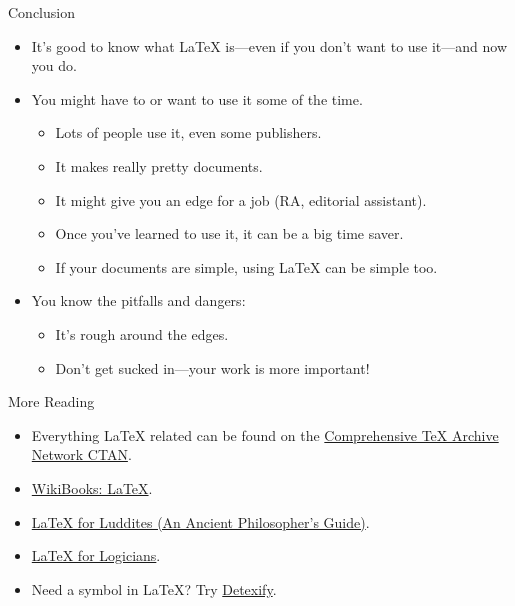 \begin{frame}{Conclusion}

\begin{itemize}
\item It's good to know what \LaTeX{} is---even if you don't want to
  use it---and now you do.
\item You might have to or want to use it some of the time.
\begin{itemize}
\item Lots of people use it, even some publishers.
\item It makes really pretty documents.
\item It might give you an edge for a job (RA, editorial assistant).
\item Once you've learned to use it, it can be a big time saver.
\item If your documents are simple, using \LaTeX{} can be simple too.
\end{itemize}
\item You know the pitfalls and dangers:
\begin{itemize}
\item It's rough around the edges.
\item Don't get sucked in---your work is more important!
\end{itemize}
\end{itemize}
\end{frame}

\begin{frame}{More Reading}

\begin{itemize}
\item Everything \LaTeX{} related can be found on the
  \href{http://www.ctan.org/}{Comprehensive \TeX{} Archive Network
    CTAN}.
\item \href{http://en.wikibooks.org/wiki/LaTeX}{WikiBooks: \LaTeX}.
\item
  \href{https://williecostello.com/latex.html}{\LaTeX{}
    for Luddites (An Ancient Philosopher's Guide)}.
\item
  \href{http://www.logicmatters.net/latex-for-logicians/}{\LaTeX{} for
    Logicians}.
\item Need a symbol in \LaTeX? Try
  \href{http://detexify.kirelabs.org/classify.html}{Detexify}.
\end{itemize}

\end{frame}


